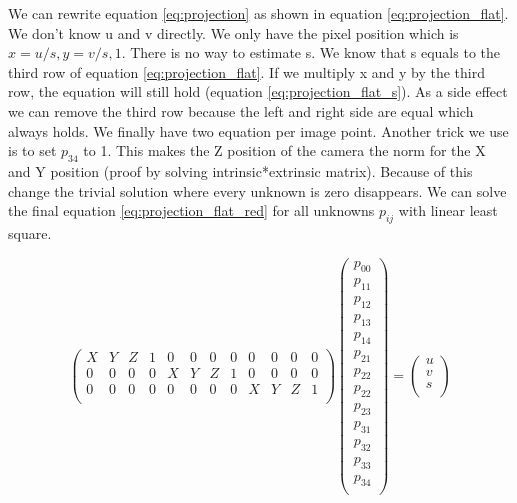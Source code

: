 \documentclass[11pt,a4paper,titlepage,oneside]{report}
\begin{document}
We can rewrite equation \ref{eq:projection} as shown in equation \ref{eq:projection_flat}. We don't know u and v directly. We only have the pixel position which is $x=u/s, y=v/s, 1$. There is no way to estimate s. We know that s equals to the third row of equation \ref{eq:projection_flat}. If we multiply x and y by the third row, the equation will still hold (equation \ref{eq:projection_flat_s}). As a side effect we can remove the third row because the left and right side are equal which always holds. We finally have two equation per image point. Another trick we use is to set $p_{34}$ to 1. This makes the Z position of the camera the norm for the X and Y position (proof by solving intrinsic*extrinsic matrix). Because of this change the trivial solution where every unknown is zero disappears. We can solve the final equation \ref{eq:projection_flat_red} for all unknowns $p_{ij}$ with linear least square.

\setcounter{MaxMatrixCols}{15}
\begin{equation}\label{eq:projection_flat}
	\begin{pmatrix}
		X & Y & Z & 1 & 0 & 0 & 0 & 0 & 0 & 0 & 0 & 0\\
		0 & 0 & 0 & 0 & X & Y & Z & 1 & 0 & 0 & 0 & 0\\
		0 & 0 & 0 & 0 & 0 & 0 & 0 & 0 & X & Y & Z & 1\\
	\end{pmatrix}
	\begin{pmatrix}p_{00}\\
		p_{11}\\
		p_{12}\\
		p_{13}\\
		p_{14}\\
		p_{21}\\
		p_{22}\\
		p_{22}\\
		p_{23}\\
		p_{31}\\
		p_{32}\\
		p_{33}\\
		p_{34} \\
	\end{pmatrix}=
	\begin{pmatrix}u\\
		v\\
		s\\
	\end{pmatrix}
\end{equation}
\end{document}
